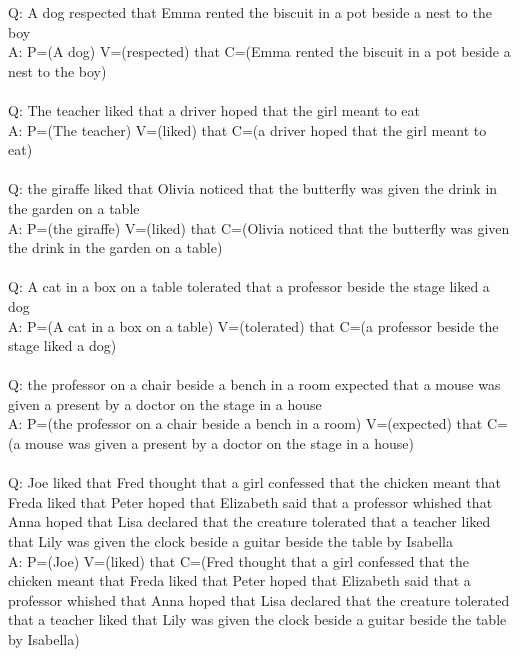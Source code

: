 \documentclass{article} \usepackage{iclr2022_conference,times}
\begin{document}
{Q: A dog respected that Emma rented the biscuit in a pot beside a nest to the boy \\
A: P=(A dog) V=(respected) that C=(Emma rented the biscuit in a pot beside a nest to the boy) \\
 \\
Q: The teacher liked that a driver hoped that the girl meant to eat \\
A: P=(The teacher) V=(liked) that C=(a driver hoped that the girl meant to eat) \\
 \\
Q: the giraffe liked that Olivia noticed that the butterfly was given the drink in the garden on a table \\
A: P=(the giraffe) V=(liked) that C=(Olivia noticed that the butterfly was given the drink in the garden on a table) \\
 \\
Q: A cat in a box on a table tolerated that a professor beside the stage liked a dog \\
A: P=(A cat in a box on a table) V=(tolerated) that C=(a professor beside the stage liked a dog) \\
 \\
Q: the professor on a chair beside a bench in a room expected that a mouse was given a present by a doctor on the stage in a house \\
A: P=(the professor on a chair beside a bench in a room) V=(expected) that C=(a mouse was given a present by a doctor on the stage in a house) \\
 \\
Q: Joe liked that Fred thought that a girl confessed that the chicken meant that Freda liked that Peter hoped that Elizabeth said that a professor whished that Anna hoped that Lisa declared that the creature tolerated that a teacher liked that Lily was given the clock beside a guitar beside the table by Isabella \\
A: P=(Joe) V=(liked) that C=(Fred thought that a girl confessed that the chicken meant that Freda liked that Peter hoped that Elizabeth said that a professor whished that Anna hoped that Lisa declared that the creature tolerated that a teacher liked that Lily was given the clock beside a guitar beside the table by Isabella)
}
\end{document}

